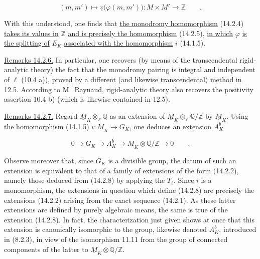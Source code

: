 \begin{equation}\tag{14.2.5}
 (m,m')\longmapsto\underline v\bigl(\varphi(m,m')\bigr):
 M\times M'\longrightarrow\mathbb Z\qquad .
\end{equation}

\noindent
With this understood, one finds that \underline{the monodromy
homomorphism} (14.2.4) \underline{takes its values in} $\mathbb Z$
\underline{and is precisely the homomorphism} (14.2.5), \underline{in
which} $\varphi$ \underline{is the splitting of} $E_K$
\underline{associated with the homomorphism} $i$ (14.1.5).

\medskip
\noindent
\underline{Remarks 14.2.6.}  In particular, one recovers (by means of
the transcendental rigid-analytic theory) the fact that the monodromy
pairing is integral and independent of $\ell$ (10.4 a)), proved by a
different (and likewise transcendental) method in 12.5.  According to
M.~Raynaud, rigid-analytic theory also recovers the positivity assertion
10.4 b) (which is likewise contained in 12.5).

\medskip
\noindent
\underline{Remarks 14.2.7.}  Regard
$\underline M_K\otimes_{\mathbb Z}\mathbb Q$ as an extension of
$\underline M_K\otimes_{\mathbb Z}\mathbb Q/\mathbb Z$ by
$\underline M_K$.  Using the homomorphism (14.1.5)
$i:\underline M_K\longrightarrow G_K$, one deduces an extension
$A_K^b$

\begin{equation}\tag{14.2.8}
 0\longrightarrow G_K\longrightarrow A_K^b
 \longrightarrow\underline M_K\otimes\mathbb Q/\mathbb Z
 \longrightarrow0\qquad .
\end{equation}

\noindent
Observe moreover that, since $G_K$ is a divisible group, the datum of
such an extension is equivalent to that of a family of extensions of
the form (14.2.2), namely those deduced from (14.2.8) by applying the
$T_\ell$.  Since $i$ is a monomorphism, the extensions in question
which define (14.2.8) are precisely the extensions (14.2.2) arising
from the exact sequence (14.2.1).  As these latter extensions are
defined by purely algebraic means, the same is true of the extension
(14.2.8).  In fact, the characterization just given shows at once that
this extension is canonically isomorphic to the group, likewise denoted
$A_K^b$, introduced in (8.2.3), in view of the isomorphism 11.11 from
the group of connected components of the latter to
$\underline M_K\otimes\mathbb Q/\mathbb Z$.

